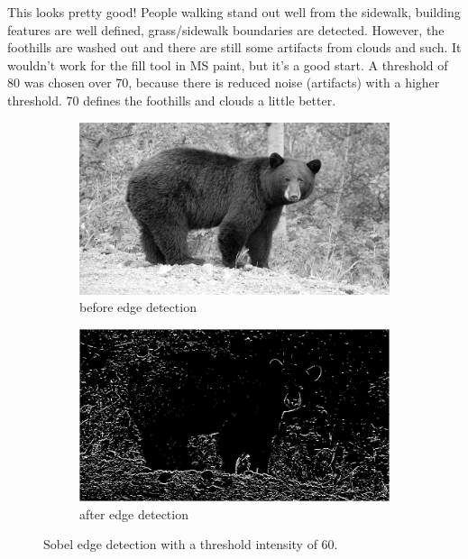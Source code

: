 \documentclass[11pt,a4paper]{article}
\begin{document}
This looks pretty good! People walking stand out well from the sidewalk, building features are well defined, grass/sidewalk boundaries are detected. However, the foothills are washed out and there are still some artifacts from clouds and such. It wouldn't work for the fill tool in MS paint, but it's a good start. A threshold of 80 was chosen over 70, because there is reduced noise (artifacts) with a higher threshold. 70 defines the foothills and clouds a little better.

\pagebreak

\begin{figure}[ht]
	\centering
	\begin{subfigure}[h]{0.75\textwidth}
		\includegraphics[width=\textwidth]{figs/test02_gray}
		\caption{before edge detection}
		\label{fig:test02_gray}
	\end{subfigure}
	
	\begin{subfigure}[h]{0.75\textwidth}
		\includegraphics[width=\textwidth]{figs/test02_edges}
		\caption{after edge detection}
		\label{fig:test02_edge}
	\end{subfigure}
	
	\caption{Sobel edge detection with a threshold intensity of 60.}
	\label{fig:edge02}
\end{figure}
\end{document}
